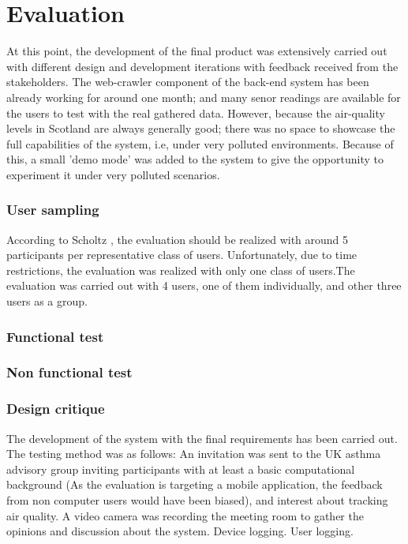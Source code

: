 \chapter{Evaluation}
At this point, the development of the final product was extensively carried out with different design and development iterations with feedback received from the stakeholders. The web-crawler component of the back-end system has been already working for around one month; and many senor readings are available for the users to test with the real gathered data. However, because the air-quality levels in Scotland are always generally good; there was no space to showcase the full capabilities of the system, i.e, under very polluted environments. Because of this, a small 'demo mode' was added to the system to give the opportunity to experiment it under very polluted scenarios. 

\subsection{User sampling}
According to Scholtz \cite{Scholtz2003}, the evaluation should be realized with around 5 participants per representative class of users. Unfortunately, due to time restrictions, the evaluation was realized with only one class of users.The evaluation was carried out with 4 users, one of them individually, and other three users as a group. 

\subsection{Functional test}


\subsection{Non functional test}

\subsection{Design critique}



The development of the system with the final requirements has been carried out. 
The testing method was as follows: An invitation was sent to the UK asthma advisory group inviting participants with at least a basic computational background (As the evaluation is targeting a mobile application, the feedback from non computer users would have been biased), and interest about tracking air quality. 
A video camera was recording the meeting room to gather the opinions and discussion about the system. 
Device logging. 
User logging. 